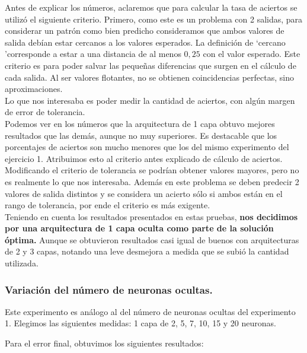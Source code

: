 Antes de explicar los números, aclaremos que para calcular la tasa de aciertos se utilizó el siguiente criterio. Primero, como este es un problema con 2 salidas, para considerar un patrón como bien predicho consideramos que ambos valores de salida debían estar cercanos a los valores esperados. La definición de \lq cercano \rq corresponde a estar a una distancia de al menos $0,25$ con el valor esperado. Este criterio es para poder salvar las pequeñas diferencias que surgen en el cálculo de cada salida. Al ser valores flotantes, no se obtienen coincidencias perfectas, sino aproximaciones.\\

Lo que nos interesaba es poder medir la cantidad de aciertos, con algún margen de error de tolerancia.\\

Podemos ver en los números que la arquitectura de 1 capa obtuvo mejores resultados que las demás, aunque no muy superiores. Es destacable que los porcentajes de aciertos son mucho menores que los del mismo experimento del ejercicio 1. Atribuimos esto al criterio antes explicado de cálculo de aciertos. Modificando el criterio de tolerancia se podrían obtener valores mayores, pero no es realmente lo que nos interesaba. Además en este problema se deben predecir 2 valores de salida distintos y se considera un acierto sólo si ambos están en el rango de tolerancia, por ende el criterio es más exigente.\\

Teniendo en cuenta los resultados presentados en estas pruebas, \textbf{nos decidimos por una arquitectura de 1 capa oculta como parte de la solución óptima.} Aunque se obtuvieron resultados casi igual de buenos con arquitecturas de 2 y 3 capas, notando una leve desmejora a medida que se subió la cantidad utilizada.

\subsubsection{Variación del número de neuronas ocultas.}

Este experimento es análogo al del número de neuronas ocultas del experimento 1. 
Elegimos las siguientes medidas: 1 capa de 2, 5, 7, 10, 15 y 20 neuronas. 

Para el error final, obtuvimos los siguientes resultados:\\

